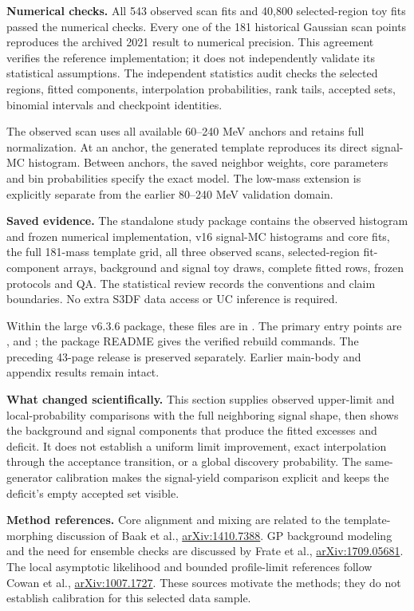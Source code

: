 \documentclass[11pt]{article}
\begin{document}
\textbf{Numerical checks.} All 543 observed scan fits and 40,800 selected-region toy fits passed the numerical checks. Every one of the 181 historical Gaussian scan points reproduces the archived 2021 result to numerical precision. This agreement verifies the reference implementation; it does not independently validate its statistical assumptions. The independent statistics audit checks the selected regions, fitted components, interpolation probabilities, rank tails, accepted sets, binomial intervals and checkpoint identities.

The observed scan uses all available 60--240 MeV anchors and retains full normalization. At an anchor, the generated template reproduces its direct signal-MC histogram. Between anchors, the saved neighbor weights, core parameters and bin probabilities specify the exact model. The low-mass extension is explicitly separate from the earlier 80--240 MeV validation domain.

\textbf{Saved evidence.} The standalone study package contains the observed histogram and frozen numerical implementation, v16 signal-MC histograms and core fits, the full 181-mass template grid, all three observed scans, selected-region fit-component arrays, background and signal toy draws, complete fitted rows, frozen protocols and QA. The statistical review records the conventions and claim boundaries. No extra S3DF data access or UC inference is required.

Within the large v6.3.6 package, these files are in . The primary entry points are ,  and ; the package README gives the verified rebuild commands. The preceding 43-page release is preserved separately. Earlier main-body and appendix results remain intact.

\textbf{What changed scientifically.} This section supplies observed upper-limit and local-probability comparisons with the full neighboring signal shape, then shows the background and signal components that produce the fitted excesses and deficit. It does not establish a uniform limit improvement, exact interpolation through the acceptance transition, or a global discovery probability. The same-generator calibration makes the signal-yield comparison explicit and keeps the deficit's empty accepted set visible.

\textbf{Method references.} Core alignment and mixing are related to the template-morphing discussion of Baak et al., \href{https://arxiv.org/abs/1410.7388}{arXiv:1410.7388}. GP background modeling and the need for ensemble checks are discussed by Frate et al., \href{https://arxiv.org/abs/1709.05681}{arXiv:1709.05681}. The local asymptotic likelihood and bounded profile-limit references follow Cowan et al., \href{https://arxiv.org/abs/1007.1727}{arXiv:1007.1727}. These sources motivate the methods; they do not establish calibration for this selected data sample.
\end{document}
